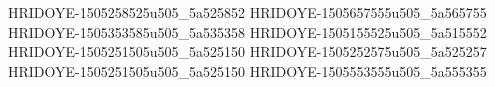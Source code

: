 HRIDOYE-1505258525u505_5a525852
HRIDOYE-1505657555u505_5a565755
HRIDOYE-1505353585u505_5a535358
HRIDOYE-1505155525u505_5a515552
HRIDOYE-1505251505u505_5a525150
HRIDOYE-1505252575u505_5a525257
HRIDOYE-1505251505u505_5a525150
HRIDOYE-1505553555u505_5a555355
